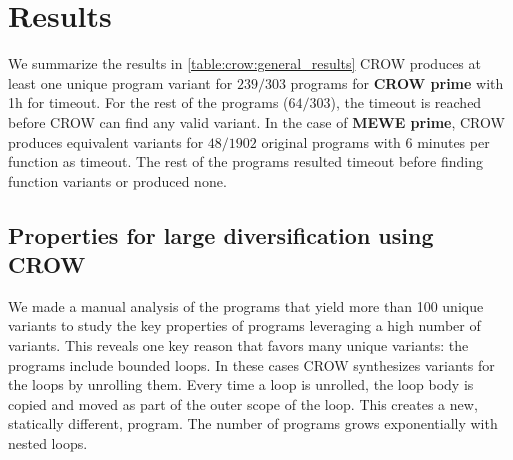 





\section{Results}

We summarize the results in \autoref{table:crow:general_results}
CROW produces at least one unique program variant for $239/303{}$ programs for \textbf{CROW prime} with 1h for timeout. For the rest of the programs ($64/303{}$), the timeout is reached before CROW can find any valid variant. 
In the case of \textbf{MEWE prime}, CROW produces equivalent variants for $48/1902$ original programs with 6 minutes per function as timeout. The rest of the programs resulted timeout before finding function variants or produced none.




\subsection{Properties for large diversification using CROW}

We made a manual analysis of the programs that yield more than 100 unique variants to study the key properties of programs leveraging a high number of variants.
This reveals one key reason that favors many unique variants: the programs include  bounded loops. In these cases CROW
synthesizes variants for the loops by unrolling them. Every time a loop is unrolled, the loop body is copied and moved as part of the outer scope of the loop. This creates a new, statically different, program. The number of programs grows exponentially with nested loops. 

